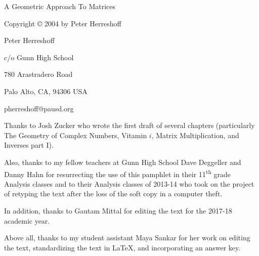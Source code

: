 \documentclass[../gatm.tex]{subfiles}
\begin{document}
\newcommand\dnew{\vspace{1cm}}

\begin{center}
\vspace*{\fill}

\doublespacing
A Geometric Approach To Matrices

Copyright \copyright{} 2004 by Peter Herreshoff

\vspace{1cm}

Peter Herreshoff

c/o Gunn High School

780 Arastradero Road

Palo Alto, CA, 94306 USA

\vspace{.5cm}

pherreshoff@pausd.org

\vspace{1cm}
\end{center}

\noindent Thanks to Josh Zucker who wrote the first draft of several chapters (particularly The Geometry of Complex Numbers, Vitamin $i$, Matrix Multiplication, and Inverses part I).

Also, thanks to my fellow teachers at Gunn High School Dave Deggeller and Danny Hahn for resurrecting the use of this pamphlet in their 11\textsuperscript{th} grade Analysis classes and to their Analysis classes of 2013-14 who took on the project of retyping the text after the loss of the soft copy in a computer theft.

In addition, thanks to Gautam Mittal for editing the text for the 2017-18 academic year.

Above all, thanks to my student assistant Maya Sankar for her work on editing the text, standardizing the text in \LaTeX{}, and incorporating an answer key.

\vspace*{\fill}
\end{document}
